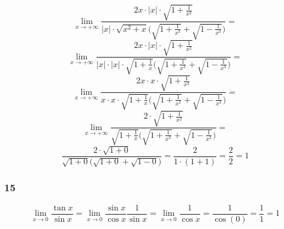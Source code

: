 \documentclass{article}
\begin{document}
\begin{equation*}
    \lim_{x \to +\infty} \frac{2x \cdot |x| \cdot \sqrt{1 + \frac{1}{x^{2}}}} {|x| \cdot \sqrt{x^2 + x}\Bigg(\sqrt{1 + \frac{1}{x^3}} + \sqrt{1 - \frac{1}{x^3}}\Bigg)} = 
\end{equation*}
\begin{equation*}
    \lim_{x \to +\infty} \frac{2x \cdot |x| \cdot \sqrt{1 + \frac{1}{x^{2}}}} {|x| \cdot |x| \cdot \sqrt{1 + \frac{1}{x}}\Bigg(\sqrt{1 + \frac{1}{x^3}} + \sqrt{1 - \frac{1}{x^3}}\Bigg)} = 
\end{equation*}
\begin{equation*}
    \lim_{x \to +\infty} \frac{2x \cdot x \cdot \sqrt{1 + \frac{1}{x^{2}}}} {x \cdot x \cdot \sqrt{1 + \frac{1}{x}}\Bigg(\sqrt{1 + \frac{1}{x^3}} + \sqrt{1 - \frac{1}{x^3}}\Bigg)} = 
\end{equation*}
\begin{equation*}
    \lim_{x \to +\infty} \frac{2 \cdot \sqrt{1 + \frac{1}{x^{2}}}} {\sqrt{1 + \frac{1}{x}}\Bigg(\sqrt{1 + \frac{1}{x^3}} + \sqrt{1 - \frac{1}{x^3}}\Bigg)} = 
\end{equation*}
\begin{equation*}
    \frac{2 \cdot \sqrt{1 + 0}} {\sqrt{1 + 0}\Bigg(\sqrt{1 + 0} + \sqrt{1 - 0}\Bigg)} = \frac{2}{1 \cdot (1 + 1)} = \frac{2}{2} = 1
\end{equation*}

\subsubsection*{15}

\begin{equation*}
    \lim_{x \to 0} \frac{\tan x}{\sin x} = \lim_{x \to 0} \frac{\sin x}{\cos x}\frac{1}{\sin x} = \lim_{x \to 0} \frac{1}{\cos x} = \frac{1}{\cos(0)} = \frac{1}{1} = 1
\end{equation*}
\end{document}
